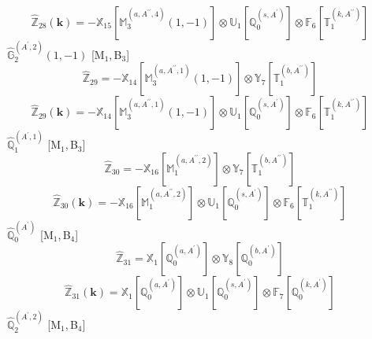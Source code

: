 \documentclass[fleqn,10pt,landscape]{article}
\begin{document}
\begin{itemize}
\begin{dmath*}
\hat{\mathbb{Z}}_{28}(\bm{k})=- \mathbb{X}_{15}[\mathbb{M}_{3}^{(a,A^{\prime\prime},4)}(1,-1)] \otimes\mathbb{U}_{1}[\mathbb{Q}_{0}^{(s,A^{\prime})}] \otimes\mathbb{F}_{6}[\mathbb{T}_{1}^{(k,A^{\prime\prime})}]
\end{dmath*}
\vspace{4mm}
\noindent {} $\,\,\,\hat{\mathbb{G}}_{2}^{(A^{\prime},2)}(1,-1)$ [M$_{1}$,\,B$_{3}$]
\begin{dmath*}
\hat{\mathbb{Z}}_{29}=- \mathbb{X}_{14}[\mathbb{M}_{3}^{(a,A^{\prime\prime},1)}(1,-1)] \otimes\mathbb{Y}_{7}[\mathbb{T}_{1}^{(b,A^{\prime\prime})}]
\end{dmath*}
\begin{dmath*}
\hat{\mathbb{Z}}_{29}(\bm{k})=- \mathbb{X}_{14}[\mathbb{M}_{3}^{(a,A^{\prime\prime},1)}(1,-1)] \otimes\mathbb{U}_{1}[\mathbb{Q}_{0}^{(s,A^{\prime})}] \otimes\mathbb{F}_{6}[\mathbb{T}_{1}^{(k,A^{\prime\prime})}]
\end{dmath*}
\vspace{4mm}
\noindent {} $\,\,\,\hat{\mathbb{Q}}_{1}^{(A^{\prime},1)}$ [M$_{1}$,\,B$_{3}$]
\begin{dmath*}
\hat{\mathbb{Z}}_{30}=- \mathbb{X}_{16}[\mathbb{M}_{1}^{(a,A^{\prime\prime},2)}] \otimes\mathbb{Y}_{7}[\mathbb{T}_{1}^{(b,A^{\prime\prime})}]
\end{dmath*}
\begin{dmath*}
\hat{\mathbb{Z}}_{30}(\bm{k})=- \mathbb{X}_{16}[\mathbb{M}_{1}^{(a,A^{\prime\prime},2)}] \otimes\mathbb{U}_{1}[\mathbb{Q}_{0}^{(s,A^{\prime})}] \otimes\mathbb{F}_{6}[\mathbb{T}_{1}^{(k,A^{\prime\prime})}]
\end{dmath*}
\vspace{4mm}
\noindent {} $\,\,\,\hat{\mathbb{Q}}_{0}^{(A^{\prime})}$ [M$_{1}$,\,B$_{4}$]
\begin{dmath*}
\hat{\mathbb{Z}}_{31}=\mathbb{X}_{1}[\mathbb{Q}_{0}^{(a,A^{\prime})}] \otimes\mathbb{Y}_{8}[\mathbb{Q}_{0}^{(b,A^{\prime})}]
\end{dmath*}
\begin{dmath*}
\hat{\mathbb{Z}}_{31}(\bm{k})=\mathbb{X}_{1}[\mathbb{Q}_{0}^{(a,A^{\prime})}] \otimes\mathbb{U}_{1}[\mathbb{Q}_{0}^{(s,A^{\prime})}] \otimes\mathbb{F}_{7}[\mathbb{Q}_{0}^{(k,A^{\prime})}]
\end{dmath*}
\vspace{4mm}
\noindent {} $\,\,\,\hat{\mathbb{Q}}_{2}^{(A^{\prime},2)}$ [M$_{1}$,\,B$_{4}$]
\begin{dmath*}

\end{dmath*}
\end{itemize}
\end{document}
